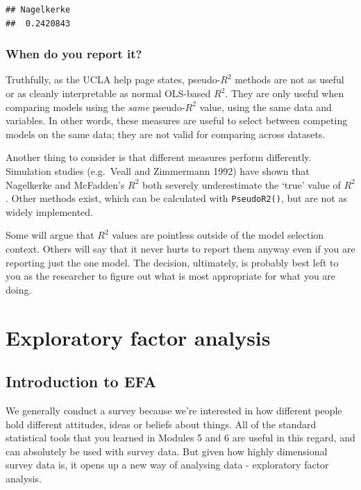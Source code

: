 \documentclass[
]{book}
\begin{document}
\begin{verbatim}
## Nagelkerke 
##  0.2420843
\end{verbatim}

\subsection{When do you report it?}\label{when-do-you-report-it}

Truthfully, as the UCLA help page states, pseudo-\(R^2\) methods are not as useful or as cleanly interpretable as normal OLS-based \(R^2\). They are only useful when comparing models using the \emph{same} pseudo-\(R^2\) value, using the same data and variables. In other words, these measures are useful to select between competing models on the same data; they are not valid for comparing across datasets.

Another thing to consider is that different measures perform differently. Simulation studies (e.g.~Veall and Zimmermann 1992) have shown that Nagelkerke and McFadden's \(R^2\) both severely underestimate the `true' value of \(R^2\). Other methods exist, which can be calculated with \texttt{PseudoR2()}, but are not as widely implemented.

Some will argue that \(R^2\) values are pointless outside of the model selection context. Others will say that it never hurts to report them anyway even if you are reporting just the one model. The decision, ultimately, is probably best left to you as the researcher to figure out what is most appropriate for what you are doing.

\chapter{Exploratory factor analysis}\label{exploratory-factor-analysis}

\section{Introduction to EFA}\label{introduction-to-efa}

We generally conduct a survey because we're interested in how different people hold different attitudes, ideas or beliefs about things. All of the standard statistical tools that you learned in Modules 5 and 6 are useful in this regard, and can absolutely be used with survey data. But given how highly dimensional survey data is, it opens up a new way of analysing data - exploratory factor analysis.
\end{document}
